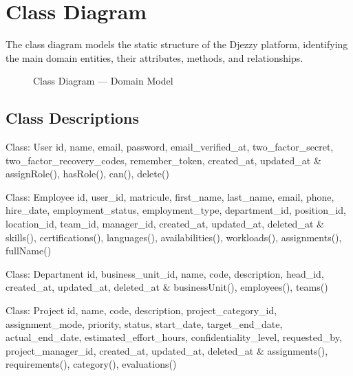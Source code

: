 \documentclass{bts-report}
\begin{document}
\section{Class Diagram}

The class diagram models the static structure of the Djezzy platform, identifying the main domain entities, their attributes, methods, and relationships.

\begin{figure}[htbp]
  \centering
  \resizebox{\textwidth}{!}{}
  \caption{Class Diagram --- Domain Model}
  \label{fig:class}
\end{figure}

\subsection{Class Descriptions}

\begin{classtable}{Class: User}
id, name, email, password, email\_verified\_at, two\_factor\_secret, two\_factor\_recovery\_codes, remember\_token, created\_at, updated\_at & assignRole(), hasRole(), can(), delete() \\
\end{classtable}

\begin{classtable}{Class: Employee}
id, user\_id, matricule, first\_name, last\_name, email, phone, hire\_date, employment\_status, employment\_type, department\_id, position\_id, location\_id, team\_id, manager\_id, created\_at, updated\_at, deleted\_at & skills(), certifications(), languages(), availabilities(), workloads(), assignments(), fullName() \\
\end{classtable}

\begin{classtable}{Class: Department}
id, business\_unit\_id, name, code, description, head\_id, created\_at, updated\_at, deleted\_at & businessUnit(), employees(), teams() \\
\end{classtable}

\begin{classtable}{Class: Project}
id, name, code, description, project\_category\_id, assignment\_mode, priority, status, start\_date, target\_end\_date, actual\_end\_date, estimated\_effort\_hours, confidentiality\_level, requested\_by, project\_manager\_id, created\_at, updated\_at, deleted\_at & assignments(), requirements(), category(), evaluations() \\
\end{classtable}
\end{document}
